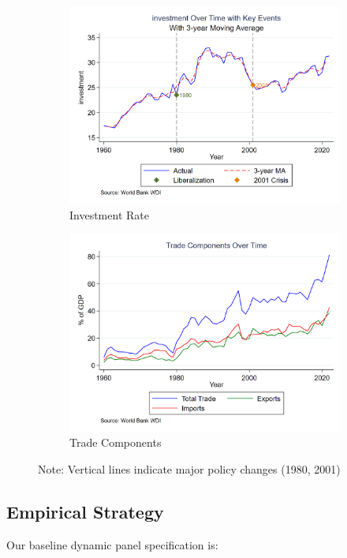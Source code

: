 \documentclass[12pt,a4paper]{article}
\theoremstyle{definition}
\begin{document}
\begin{figure}[H]
\begin{subfigure}{.48\textwidth}
\centering
\includegraphics[width=\textwidth]{output/investment_advanced_trend.png}
\caption{Investment Rate}
\end{subfigure}
\begin{subfigure}{.48\textwidth}
\centering
\includegraphics[width=\textwidth]{output/trade_components.png}
\caption{Trade Components}
\end{subfigure}
\caption*{Note: Vertical lines indicate major policy changes (1980, 2001)}
\end{figure}

\subsection{Empirical Strategy}
Our baseline dynamic panel specification is:
\end{document}
